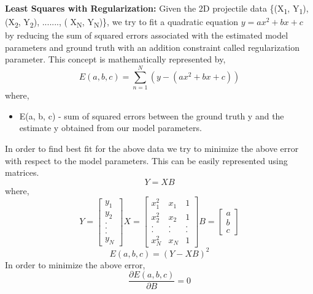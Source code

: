 \documentclass{article}
\begin{document}
\newline \newline \textbf{Least Squares with Regularization:}
\newline Given the 2D projectile data \{(X\textsubscript{1}, Y\textsubscript{1}), (X\textsubscript{2}, Y\textsubscript{2}), ......., ( X\textsubscript{N}, Y\textsubscript{N})\}, we try to fit a quadratic equation $y = a{x^2} + bx + c$ by reducing the sum of squared errors associated with the estimated model parameters and ground truth with an addition constraint called regularization parameter. This concept is mathematically represented by,
\begin{equation}
\boxed{E(a, b, c) = \sum_{n = 1}^{N} (y - (a{x^2} + bx + c))}
\end{equation}
where,
\begin{itemize}
    \item E(a, b, c) - sum of squared errors between the ground truth y and the estimate y obtained from our model parameters. 
\end{itemize}
In order to find best fit for the above data we try to minimize the above error with respect to the model parameters. This can be easily represented using matrices.
\begin{equation}
\boxed{Y = XB}
\end{equation}
where, 
\begin{equation}
\boxed{Y = 
\begin{bmatrix}
y_1 \\ y_2 \\ . \\ . \\ . \\ y_N
\end{bmatrix}
X = 
\begin{bmatrix}
x^2_1 & x_1 & 1 \\ x^2_2 & x_2 & 1 \\ . & . & . \\ . & . & . \\
x^2_N & x_N & 1 
\end{bmatrix}
B = 
\begin{bmatrix}
a \\ b \\ c
\end{bmatrix}}
\end{equation}
\begin{equation}
\boxed{E(a, b, c) = (Y - XB)^2}
\end{equation}
In order to minimize the above error,
\begin{equation}
\boxed{\frac{\partial E(a, b, c)}{\partial B} = 0}
\end{equation}
\end{document}

